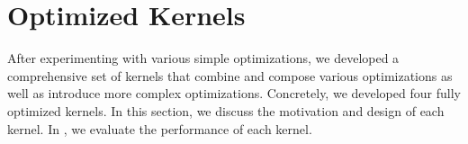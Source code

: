 \section{Optimized Kernels}\label{sec:kernels}
After experimenting with various simple optimizations, we developed a
comprehensive set of kernels that combine and compose various optimizations as
well as introduce more complex optimizations. Concretely, we developed four
fully optimized kernels. In this section, we discuss the motivation and design
of each kernel. In , we evaluate the performance of each kernel.
